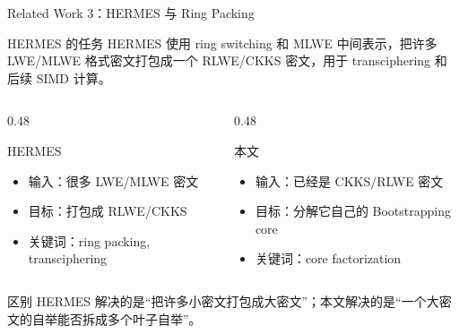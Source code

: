 \documentclass[aspectratio=169, 10pt, xcolor=svgnames, table, UTF8]{ctexbeamer}
\begin{document}
\begin{frame}{Related Work 3：HERMES 与 Ring Packing}
  \begin{block}{HERMES 的任务}
    HERMES 使用 ring switching 和 MLWE 中间表示，把许多 LWE/MLWE 格式密文打包成一个 RLWE/CKKS 密文，用于 transciphering 和后续 SIMD 计算。
  \end{block}
  
  \pause
  \begin{columns}
    \begin{column}{0.48\linewidth}
      \begin{block}{HERMES}
        \begin{itemize}
          \item 输入：很多 LWE/MLWE 密文
          \item 目标：打包成 RLWE/CKKS
          \item 关键词：ring packing, transciphering
        \end{itemize}
      \end{block}
    \end{column}
    \begin{column}{0.48\linewidth}
      \begin{block}{本文}
        \begin{itemize}
          \item 输入：已经是 CKKS/RLWE 密文
          \item 目标：分解它自己的 Bootstrapping core
          \item 关键词：core factorization
        \end{itemize}
      \end{block}
    \end{column}
  \end{columns}
  
  \pause
  \begin{alertblock}{区别}
    HERMES 解决的是“把许多小密文打包成大密文”；本文解决的是“一个大密文的自举能否拆成多个叶子自举”。
  \end{alertblock}
\end{frame}
\end{document}
